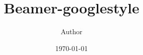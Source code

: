 \documentclass[12pt, aspectratio=169, uplatex, dvipdfmx]{beamer}
\title{Beamer-googlestyle}
\author{Author}
\date{\today}
\institute{Institute}
\begin{document}
\frame{\maketitle}
\end{document}
